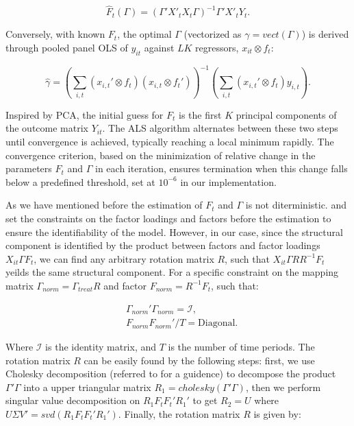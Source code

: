 \documentclass[12pt]{article}
\begin{document}
\begin{equation}
\label{app: eqn update f}
\hat{F}_t(\Gamma) = (\Gamma' X'_t X_t \Gamma)^{-1} \Gamma' X'_t Y_t.
\end{equation}

Conversely, with known $F_{t}$, the optimal $\Gamma$ (vectorized as $\gamma = vect(\Gamma)$) is derived through pooled panel OLS of $y_{it}$ against $LK$ regressors, $x_{it} \otimes f_t$:

\begin{equation}
\label{app: eqn update gamma}
\hat{\gamma} = \left( \sum_{i,t} (x_{i,t}' \otimes f_t) (x_{i,t} \otimes f_t') \right)^{-1} \left( \sum_{i,t} (x_{i,t}' \otimes f_t) y_{i,t} \right).
\end{equation}

Inspired by PCA, the initial guess for $F_t$ is the first $K$ principal components of the outcome matrix $Y_{it}$. The ALS algorithm alternates between these two steps until convergence is achieved, typically reaching a local minimum rapidly. The convergence criterion, based on the minimization of relative change in the parameters $F_t$ and $\Gamma$ in each iteration, ensures termination when this change falls below a predefined threshold, set at $10^{-6}$ in our implementation.

As we have mentioned before the estimation of $F_{t}$ and $\Gamma$ is not diterministic. \cite{bai2009panel} and \cite{xu2017generalized} set the constraints on the factor loadings and factors before the estimation to ensure the identifiability of the model. However, in our case, since the structural component is identified by the product between factors and factor loadings $X_{it}\Gamma F_{t}$, we can find any arbitrary rotation matrix $R$, such that $X_{it}\Gamma R R^{-1}F_{t}$ yeilds the same structural component. For a specific constraint on the mapping matrix $\Gamma_{norm} = \Gamma_{treat}R$ and factor $F_{norm} = R^{-1}F_t$, such that:

\begin{equation}
\begin{aligned}
& \Gamma_{norm}'\Gamma_{norm} = \mathcal{I}, \\
& F_{norm} F_{norm}'/T = \text{Diagonal}.
\end{aligned}
\end{equation}

\noindent Where $\mathcal{I}$ is the identity matrix, and $T$ is the number of time periods. The rotation matrix $R$ can be easily found by the following steps: first, we use Cholesky decomposition (referred to \cite{higham2009cholesky} for a guidence) to decompose the product $\Gamma' \Gamma$ into a upper triangular matrix $R_1 = cholesky(\Gamma' \Gamma)$, then we perform singular value decomposition on $R_1F_tF_t'R_1'$ to get $R_2 = U$ where $U\Sigma V'=svd(R_1F_tF_t'R_1')$. Finally, the rotation matrix $R$ is given by:
\end{document}
